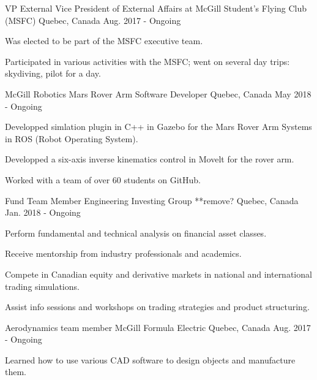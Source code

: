 
\begin{cventries}
\cventry
    {VP External}
    {Vice President of External Affairs at McGill Student's Flying Club (MSFC)}
    {Quebec, Canada}
    {Aug. 2017 - Ongoing}
    {
      \begin{cvitems}
        \item {Was elected to be part of the MSFC executive team.}
        \item {Participated in various activities with the MSFC; went on several day trips: skydiving, pilot for a day.}
      \end{cvitems}
    }    \newline

\cventry
    {McGill Robotics}
    {Mars Rover Arm Software Developer}
    {Quebec, Canada}
    {May 2018 - Ongoing}
    {
      \begin{cvitems}
        \item {Developped simlation plugin in C++ in Gazebo for the Mars Rover Arm Systems in ROS (Robot Operating System).}
        \item {Developped a six-axis inverse kinematics control in Movelt for the rover arm.}
        \item {Worked with a team of over 60 students on GitHub.}
      \end{cvitems}
    }    \newline
    \cventry
    {Fund Team Member}
    {Engineering Investing Group **remove?}
    {Quebec, Canada}
    {Jan. 2018 - Ongoing}
    {
      \begin{cvitems}
        \item {Perform fundamental and technical analysis on financial asset classes.}
        \item {Receive mentorship from industry professionals and academics.}
        \item {Compete in Canadian equity and derivative markets in national and international trading simulations.}
        \item {Assist info sessions and workshops on trading strategies and product structuring.}
      \end{cvitems}
    }	 \newline
\cventry
    {Aerodynamics team member}
    {McGill Formula Electric}
    {Quebec, Canada}
    {Aug. 2017 - Ongoing}
    {
      \begin{cvitems}
        \item {Learned how to use various CAD software to design objects and manufacture them.}

\end{cvitems}}
\end{cventries}
